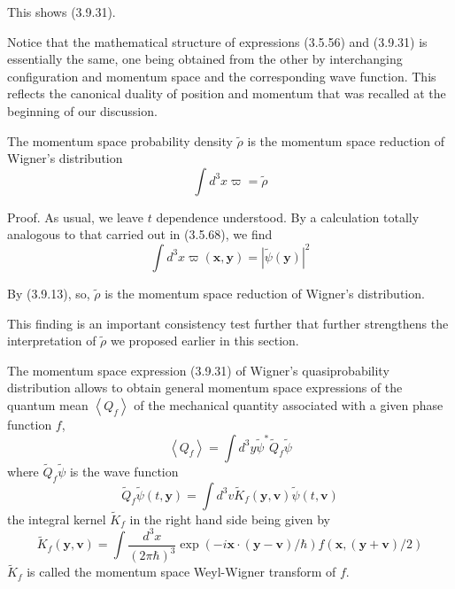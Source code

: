 \documentclass{article}
\begin{document}
This shows (3.9.31).

Notice that the mathematical structure of expressions (3.5.56) and (3.9.31) is essentially the same, one being obtained from the other by interchanging configuration and momentum space and the corresponding wave function. This reflects the canonical duality of position and momentum that was recalled at the beginning of our discussion.

The momentum space probability density $\tilde{\rho}$ is the momentum space reduction of Wigner's distribution
$$
\begin{equation*}
\int d^{3} x \varpi=\tilde{\rho} \tag{3.9.34}
\end{equation*}
$$

Proof. As usual, we leave $t$ dependence understood. By a calculation totally analogous to that carried out in (3.5.68), we find
$$
\begin{equation*}
\int d^{3} x \varpi(\boldsymbol{x}, \boldsymbol{y})=|\tilde{\psi}(\boldsymbol{y})|^{2} \tag{3.9.35}
\end{equation*}
$$

By (3.9.13), so, $\tilde{\rho}$ is the momentum space reduction of Wigner's distribution.

This finding is an important consistency test further that further strengthens the interpretation of $\tilde{\rho}$ we proposed earlier in this section.

The momentum space expression (3.9.31) of Wigner's quasiprobability distribution allows to obtain general momentum space expressions of the quantum mean $\left\langle Q_{f}\right\rangle$ of the mechanical quantity associated with a given phase function $f$,
$$
\begin{equation*}
\left\langle Q_{f}\right\rangle=\int d^{3} y \tilde{\psi}^{*} \tilde{Q}_{f} \tilde{\psi} \tag{3.9.36}
\end{equation*}
$$
where $\tilde{Q}_{f} \tilde{\psi}$ is the wave function
$$
\begin{equation*}
\tilde{Q}_{f} \tilde{\psi}(t, \boldsymbol{y})=\int d^{3} v \tilde{K}_{f}(\boldsymbol{y}, \boldsymbol{v}) \tilde{\psi}(t, \boldsymbol{v}) \tag{3.9.37}
\end{equation*}
$$
the integral kernel $\tilde{K}_{f}$ in the right hand side being given by
$$
\begin{equation*}
\tilde{K}_{f}(\boldsymbol{y}, \boldsymbol{v})=\int \frac{d^{3} x}{(2 \pi \hbar)^{3}} \exp (-i \boldsymbol{x} \cdot(\boldsymbol{y}-\boldsymbol{v}) / \hbar) f(\boldsymbol{x},(\boldsymbol{y}+\boldsymbol{v}) / 2) \tag{3.9.38}
\end{equation*}
$$
$\tilde{K}_{f}$ is called the momentum space Weyl-Wigner transform of $f$.
\end{document}
